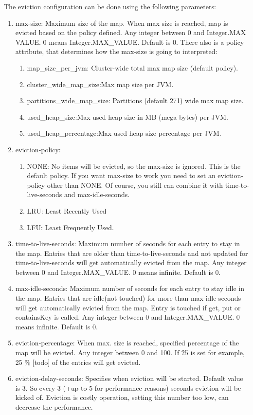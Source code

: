The eviction configuration can be done using the following parameters:
\begin{enumerate}
\item max-size: Maximum size of the map. When max size is reached, map is evicted based on the policy defined. Any integer between 0 and Integer.MAX VALUE. 0 means Integer.MAX\_VALUE. Default is 0. There also is a policy attribute, that determines how the max-size is going to interpreted:
   \begin{enumerate}
   		\item map\_size\_per\_jvm: Cluster-wide total max map size (default policy).
   		\item cluster\_wide\_map\_size:Max map size per JVM.
   		\item partitions\_wide\_map\_size: Partitions (default 271) wide max map size.
   		\item used\_heap\_size:Max used heap size in MB (mega-bytes) per JVM.
   		\item used\_heap\_percentage:Max used heap size percentage per JVM.
   \end{enumerate}	
\item eviction-policy:
   \begin{enumerate}
   	 	\item NONE: No items will be evicted, so the max-size is ignored. This is the default policy. If you want max-size to work you need to set an eviction-policy other than NONE. Of course, you still can combine it with time-to-live-seconds and  max-idle-seconds.
	 	\item LRU: Least Recently Used
	 	\item LFU: Least Frequently Used.
	\end{enumerate}
\item time-to-live-seconds: Maximum number of seconds for each entry to stay in the map. Entries that are older than time-to-live-seconds and not updated for time-to-live-seconds will get automatically evicted from the map. Any integer between 0 and Integer.MAX\_VALUE. 0 means infinite. Default is 0.
\item max-idle-seconds:  Maximum number of seconds for each entry to stay idle in the map. Entries that are idle(not touched) for more than max-idle-seconds will get automatically evicted from the map. Entry is touched if get, put or containsKey is called. Any integer between 0 and Integer.MAX\_VALUE. 0 means infinite. Default is 0.
\item eviction-percentage:  When max. size is reached, specified percentage of
    the map will be evicted. Any integer between 0 and 100. If 25 is set for example, 25 \% [todo] of the entries will get evicted.
\item eviction-delay-seconds:	 Specifies when eviction will be started. Default value is 3. So every 3 (+up to 5 for performance reasons) seconds eviction will be kicked of. Eviction is costly operation, setting this number too low, can decrease the performance.
\end{enumerate}

